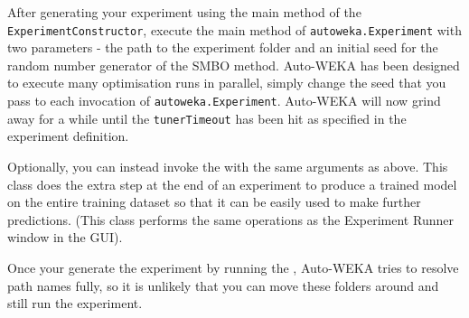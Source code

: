 
After generating your experiment using the main method of the \texttt{ExperimentConstructor}, execute the main method of \texttt{autoweka.Experiment} with two parameters - the path to the experiment folder and an initial seed for the random number generator of the SMBO method. Auto-WEKA has been designed to execute many optimisation runs in parallel, simply change the seed that you pass to each invocation of \texttt{autoweka.Experiment}. Auto-WEKA will now grind away for a while until the \texttt{tunerTimeout} has been hit as specified in the experiment definition.

Optionally, you can instead invoke the  with the same arguments as above. This class does the extra step at the end of an experiment to produce a trained model on the entire training dataset so that it can be easily used to make further predictions. (This class performs the same operations as the Experiment Runner window in the GUI).

\begin{aside}
 Once your generate the experiment by running the , Auto-WEKA tries to resolve path names fully, so it is unlikely that you can move these folders around and still run the experiment.
\end{aside}
